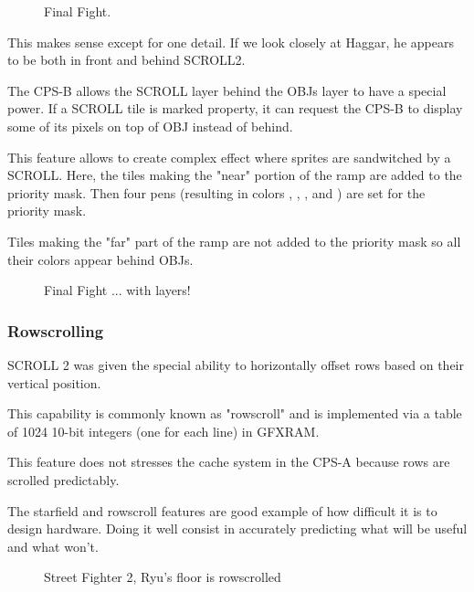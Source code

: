 \vfill
\begin{figure}[!b]
 \caption*{Final Fight.}%
 \end{figure}%
\pagebreak


This makes sense except for one detail. If we look closely at Haggar, he appears to be both in front and behind SCROLL2.

The CPS-B allows the SCROLL layer behind the OBJs layer to have a special power. If a SCROLL tile is marked property, it can request the CPS-B to display some of its pixels on top of OBJ instead of behind.

This feature allows to create complex effect where sprites are sandwitched by a SCROLL. Here, the tiles making the "near" portion of the ramp are added to the priority mask. Then four pens (resulting in colors  ,  ,  , and ) are set for the priority mask.

Tiles making the "far" part of the ramp are not added to the priority mask so all their colors appear behind OBJs.

\vfill
\begin{figure}[!b]
 \caption*{Final Fight ... with layers!}%
 \end{figure}%
\pagebreak

\subsubsection{Rowscrolling}
SCROLL 2 was given the special ability to horizontally offset rows based on their vertical position. 

This capability is commonly known as "rowscroll" and is implemented via a table of 1024 10-bit integers (one for each line) in GFXRAM.

This feature does not stresses the cache system in the CPS-A because rows are scrolled predictably.


The starfield and rowscroll features are good example of how difficult it is to design hardware. Doing it well consist in accurately predicting what will be useful and what won't. 

\vfill
\begin{figure}[!b]
 \caption*{Street Fighter 2, Ryu's floor is rowscrolled}%
 \end{figure}%
\pagebreak

